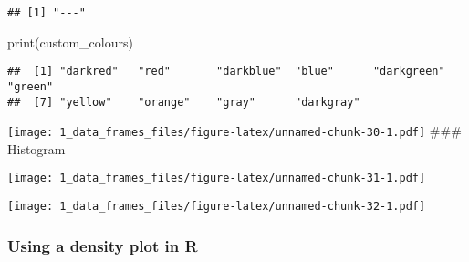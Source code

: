 \documentclass[
]{article}
\newenvironment{Shaded}{\begin{snugshade}}{\end{snugshade}}
\newcommand{\AttributeTok}[1]{\textcolor[rgb]{0.77,0.63,0.00}{#1}}
\newcommand{\DecValTok}[1]{\textcolor[rgb]{0.00,0.00,0.81}{#1}}
\newcommand{\FunctionTok}[1]{\textcolor[rgb]{0.00,0.00,0.00}{#1}}
\newcommand{\NormalTok}[1]{#1}
\newcommand{\SpecialCharTok}[1]{\textcolor[rgb]{0.00,0.00,0.00}{#1}}
\newcommand{\StringTok}[1]{\textcolor[rgb]{0.31,0.60,0.02}{#1}}
\begin{document}
\begin{verbatim}
## [1] "---"
\end{verbatim}

\begin{Shaded}
\begin{Highlighting}[]
\FunctionTok{print}\NormalTok{(custom\_colours)}
\end{Highlighting}
\end{Shaded}

\begin{verbatim}
##  [1] "darkred"   "red"       "darkblue"  "blue"      "darkgreen" "green"    
##  [7] "yellow"    "orange"    "gray"      "darkgray"
\end{verbatim}

\begin{Shaded}
\end{Shaded}

\texttt{[image: 1\_data\_frames\_files/figure-latex/unnamed-chunk-30-1.pdf]}
\#\#\# Histogram

\begin{Shaded}
\end{Shaded}

\texttt{[image: 1\_data\_frames\_files/figure-latex/unnamed-chunk-31-1.pdf]}

\begin{Shaded}
\end{Shaded}

\texttt{[image: 1\_data\_frames\_files/figure-latex/unnamed-chunk-32-1.pdf]}

\hypertarget{using-a-density-plot-in-r}{%
\subsubsection{Using a density plot in
R}\label{using-a-density-plot-in-r}}
\end{document}
